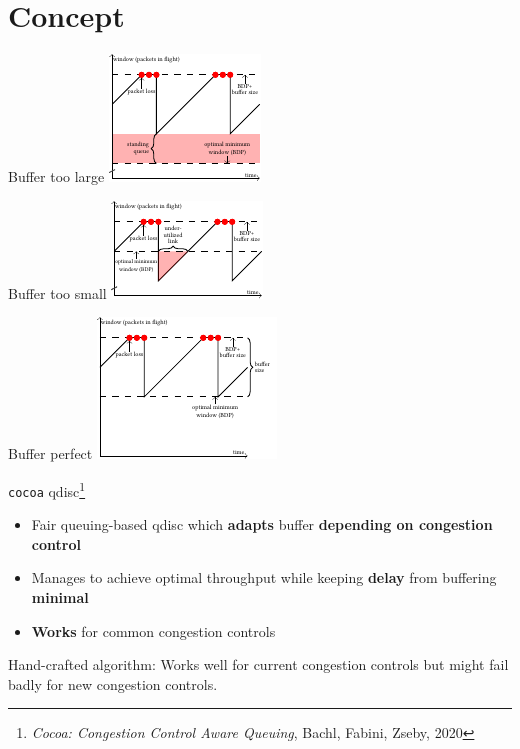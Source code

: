 \documentclass[xcolor={dvipsnames}]{beamer}
\begin{document}
\section{Concept}

\begin{frame}{Buffer too large}
            \centering
  \includegraphics[height=0.9\textheight,keepaspectratio]{figures/cocoa_illustration_too_much.pdf}
\end{frame}

\begin{frame}{Buffer too small}
            \centering
  \includegraphics[height=0.9\textheight,keepaspectratio]{figures/cocoa_illustration_too_little.pdf}
\end{frame}

\begin{frame}{Buffer perfect}
            \centering
  \includegraphics[height=0.9\textheight,keepaspectratio]{figures/cocoa_illustration_perfect.pdf}
\end{frame}

\begin{frame}{\texttt{cocoa} qdisc\footnote{\textit{Cocoa: Congestion Control Aware Queuing}, Bachl, Fabini, Zseby, 2020}}
\begin{itemize}
\item Fair queuing-based qdisc which \textbf{adapts} buffer \textbf{depending on congestion control}
\item Manages to achieve optimal throughput while keeping \textbf{delay} from buffering \textbf{minimal}
\item \textbf{Works} for common congestion controls
\end{itemize}
\pause
\begin{alertblock}{Hand-crafted algorithm:}
Works well for current congestion controls but might fail badly for new congestion controls.
\end{alertblock}
\end{frame}
\end{document}
